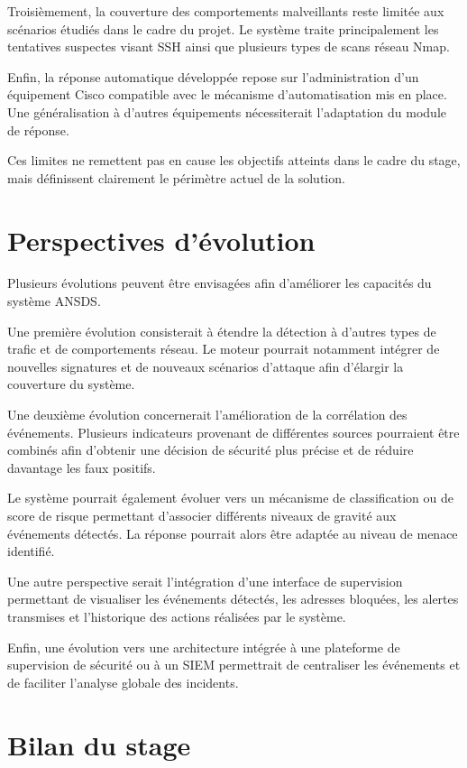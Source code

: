 Troisièmement, la couverture des comportements malveillants reste limitée aux scénarios étudiés dans le cadre du projet. Le système traite principalement les tentatives suspectes visant SSH ainsi que plusieurs types de scans réseau Nmap.

Enfin, la réponse automatique développée repose sur l'administration d'un équipement Cisco compatible avec le mécanisme d'automatisation mis en place. Une généralisation à d'autres équipements nécessiterait l'adaptation du module de réponse.

Ces limites ne remettent pas en cause les objectifs atteints dans le cadre du stage, mais définissent clairement le périmètre actuel de la solution.


\section{Perspectives d'évolution}

Plusieurs évolutions peuvent être envisagées afin d'améliorer les capacités du système ANSDS.

Une première évolution consisterait à étendre la détection à d'autres types de trafic et de comportements réseau. Le moteur pourrait notamment intégrer de nouvelles signatures et de nouveaux scénarios d'attaque afin d'élargir la couverture du système.

Une deuxième évolution concernerait l'amélioration de la corrélation des événements. Plusieurs indicateurs provenant de différentes sources pourraient être combinés afin d'obtenir une décision de sécurité plus précise et de réduire davantage les faux positifs.

Le système pourrait également évoluer vers un mécanisme de classification ou de score de risque permettant d'associer différents niveaux de gravité aux événements détectés. La réponse pourrait alors être adaptée au niveau de menace identifié.

Une autre perspective serait l'intégration d'une interface de supervision permettant de visualiser les événements détectés, les adresses bloquées, les alertes transmises et l'historique des actions réalisées par le système.

Enfin, une évolution vers une architecture intégrée à une plateforme de supervision de sécurité ou à un SIEM permettrait de centraliser les événements et de faciliter l'analyse globale des incidents.


\section{Bilan du stage}

